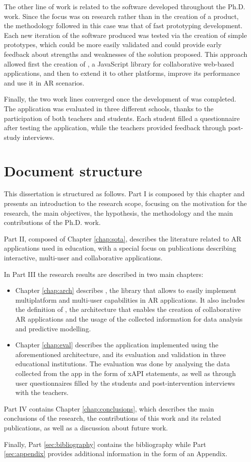 The other line of work is related to the software developed throughout the Ph.D. work. Since the focus was on research rather than in the creation of a product, the methodology followed in this case was that of fast prototyping development. Each new iteration of the software produced was tested via the creation of simple prototypes, which could be more easily validated and could provide early feedback about strengths and weaknesses of the solution proposed. This approach allowed first the creation of \textit{\ork{}}, a JavaScript library for collaborative web-based applications, and then to extend it to other platforms, improve its performance and use it in AR scenarios.

Finally, the two work lines converged once the development of \appname{} was completed. The application was evaluated in three different schools, thanks to the participation of both teachers and students. Each student filled a questionnaire after testing the application, while the teachers provided feedback through post-study interviews.

\section{Document structure}
This dissertation is structured as follows. Part I is composed by this chapter and presents an introduction to the research scope, focusing on the motivation for the research, the main objectives, the hypothesis, the methodology and the main contributions of the Ph.D. work.

Part II, composed of Chapter \ref{chap:sota}, describes the literature related to AR applications used in education, with a special focus on publications describing interactive, multi-user and collaborative applications.

In Part III the research results are described in two main chapters:
\begin{itemize}
    \item Chapter \ref{chap:arch} describes \ork{}, the library that allows to easily implement multiplatform and multi-user capabilities in AR applications. It also includes the  definition of \arch{}, the architecture that enables the creation of collaborative AR applications and the usage of the collected information for data analysis and predictive modelling.
    \item Chapter \ref{chap:eval} describes the application implemented using the aforementioned architecture, and its evaluation and validation in three educational institutions. The evaluation was done by analysing the data collected from the app in the form of xAPI statements, as well as through user questionnaires filled by the students and post-intervention interviews with the teachers.
\end{itemize}

Part IV contains Chapter \ref{chap:conclusions}, which describes the main conclusions of the research, the contributions of this work and its related publications, as well as a discussion about future work.

Finally, Part \ref{sec:bibliography} contains the bibliography while Part \ref{sec:appendix} provides additional information in the form of an Appendix.
